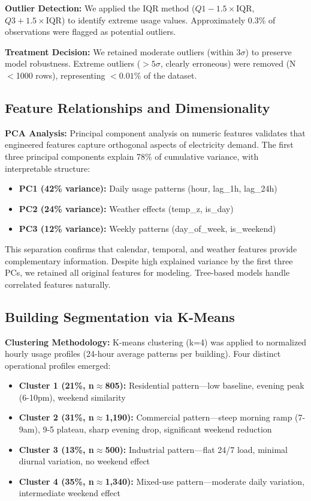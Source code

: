 \documentclass[11pt,a4paper]{article}
\begin{document}
\textbf{Outlier Detection:}
We applied the IQR method ($Q1 - 1.5 \times \text{IQR}$, $Q3 + 1.5 \times \text{IQR}$) to identify extreme usage values. Approximately 0.3\% of observations were flagged as potential outliers.

\textbf{Treatment Decision:}
We retained moderate outliers (within 3$\sigma$) to preserve model robustness. Extreme outliers ($>5\sigma$, clearly erroneous) were removed (N$<$1000 rows), representing $<0.01\%$ of the dataset.

\subsection{Feature Relationships and Dimensionality}

\textbf{PCA Analysis:}
Principal component analysis on numeric features validates that engineered features capture orthogonal aspects of electricity demand. The first three principal components explain 78\% of cumulative variance, with interpretable structure:
\begin{itemize}[leftmargin=*]
  \item \textbf{PC1 (42\% variance):} Daily usage patterns (hour, lag\_1h, lag\_24h)
  \item \textbf{PC2 (24\% variance):} Weather effects (temp\_z, is\_day)
  \item \textbf{PC3 (12\% variance):} Weekly patterns (day\_of\_week, is\_weekend)
\end{itemize}

This separation confirms that calendar, temporal, and weather features provide complementary information. Despite high explained variance by the first three PCs, we retained all original features for modeling. Tree-based models handle correlated features naturally.

\subsection{Building Segmentation via K-Means}

\textbf{Clustering Methodology:}
K-means clustering (k=4) was applied to normalized hourly usage profiles (24-hour average patterns per building). Four distinct operational profiles emerged:
\begin{itemize}[leftmargin=*]
  \item \textbf{Cluster 1 (21\%, n$\approx$805):} Residential pattern---low baseline, evening peak (6-10pm), weekend similarity
  \item \textbf{Cluster 2 (31\%, n$\approx$1,190):} Commercial pattern---steep morning ramp (7-9am), 9-5 plateau, sharp evening drop, significant weekend reduction
  \item \textbf{Cluster 3 (13\%, n$\approx$500):} Industrial pattern---flat 24/7 load, minimal diurnal variation, no weekend effect
  \item \textbf{Cluster 4 (35\%, n$\approx$1,340):} Mixed-use pattern---moderate daily variation, intermediate weekend effect
\end{itemize}
\end{document}
